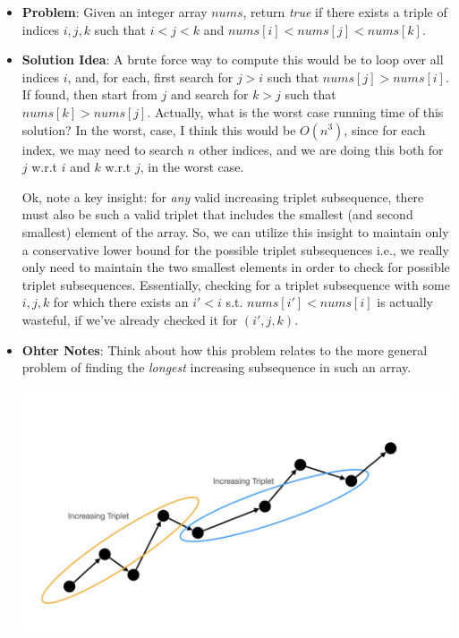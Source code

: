 \documentclass[10pt,a4paper]{article}
\begin{document}
\begin{itemize}
    \item \textbf{Problem}: Given an integer array $nums$, return \textit{true} if there exists a triple of indices $i,j,k$ such that $i < j < k$ and $nums[i] < nums[j] < nums[k]$.
    \item \textbf{Solution Idea}: A brute force way to compute this would be to loop over all indices $i$, and, for each, first search for $j > i$ such that $nums[j] > nums[i]$. If found, then start from $j$ and search for $k > j$ such that $nums[k] > nums[j]$. Actually, what is the worst case running time of this solution? In the worst, case, I think this would be $O(n^3)$, since for each index, we may need to search $n$ other indices, and we are doing this both for $j$ w.r.t $i$ and $k$ w.r.t $j$, in the worst case.
    
    Ok, note a key insight: for \textit{any} valid increasing triplet subsequence, there must also be such a valid triplet that includes the smallest (and second smallest) element of the array. So, we can utilize this insight to maintain only a conservative lower bound for the possible triplet subsequences i.e., we really only need to maintain the two smallest elements in order to check for possible triplet subsequences. Essentially, checking for a triplet subsequence with some $i,j,k$ for which there exists an $i' < i$ s.t. $nums[i'] < nums[i]$ is actually wasteful, if we've already checked it for $(i',j,k)$.
    \item \textbf{Ohter Notes}: Think about how this problem relates to the more general problem of finding the \textit{longest} increasing subsequence in such an array.
    
    \begin{center}
        \includegraphics[scale=0.1]{diagrams/algorithms_notes_diagrams/algorithms_notes_diagrams.002.png}
    \end{center}
\end{itemize}
\end{document}

